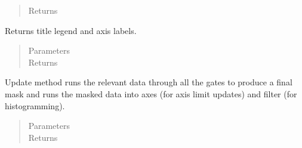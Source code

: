 \documentclass[letterpaper,10pt,english]{sphinxmanual}
\begin{document}
\begin{fulllineitems}
\begin{fulllineitems}
\begin{quote}
\begin{description}
\item[{Returns}] \leavevmode
\sphinxAtStartPar


\end{description}\end{quote}

\end{fulllineitems}


\begin{fulllineitems}
\label{\detokenize{autodocs/plot:listmode.plot.Plot.get_plot_labels}}
\sphinxAtStartPar
Returns title legend and axis labels.
\begin{quote}\begin{description}
\item[{Parameters}] \leavevmode
\sphinxAtStartPar
{} \textendash{} 

\item[{Returns}] \leavevmode
\sphinxAtStartPar


\end{description}\end{quote}

\end{fulllineitems}


\begin{fulllineitems}
\label{\detokenize{autodocs/plot:listmode.plot.Plot.update}}
\sphinxAtStartPar
Update method runs the relevant data through all the gates to produce a final mask and runs the masked data into
axes (for axis limit updates) and filter (for histogramming).
\begin{quote}\begin{description}
\item[{Parameters}] \leavevmode
\sphinxAtStartPar
{} \textendash{} 

\item[{Returns}] \leavevmode
\sphinxAtStartPar


\end{description}\end{quote}

\end{fulllineitems}


\end{fulllineitems}
\end{document}
